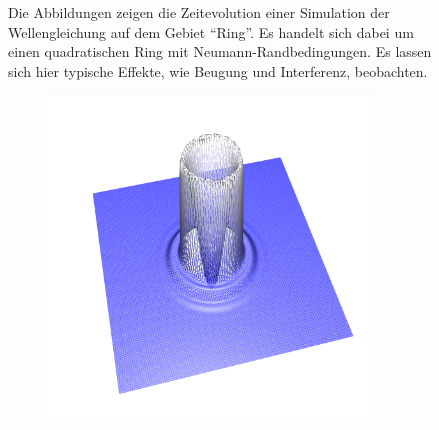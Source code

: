 \documentclass[crop=false,10pt,ngerman]{standalone}
\begin{document}
\begin{figure}[p]
\begin{subfigure}[b]{0.24\textwidth}
          \caption{}
        \end{subfigure}
        \caption[Wellensimulation auf einem quadratischen Ring]{%
          Die Abbildungen zeigen die Zeitevolution einer Simulation der Wellengleichung auf dem Gebiet \enquote{Ring}.
          Es handelt sich dabei um einen quadratischen Ring mit Neumann-Randbedingungen.
          Es lassen sich hier typische Effekte, wie Beugung und Interferenz, beobachten.
        }
        \label{fig:ring-wave}
      \end{figure}

      \begin{figure}[p]
        \center
        \begin{subfigure}[b]{0.24\textwidth}
          \center
          \includegraphics[trim={2cm 1.5cm 1.2cm 1.0cm},clip,width=0.95\textwidth]{images/quad_wave_0.png}
          \caption{}
        \end{subfigure}
        \begin{subfigure}[b]{0.24\textwidth}
          \center

\end{subfigure}
\end{figure}
\end{document}
